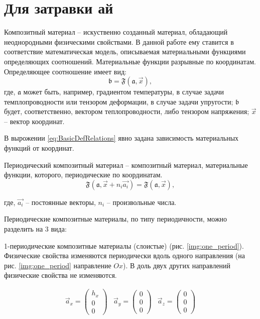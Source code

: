 \chapter{Для затравки ай} \label{chapt1}

Композитный материал -- искуственно созданный материал, обладающий неоднородными физическими свойствами.
В данной работе ему ставится в соответствие математическая модель, описываемая материальными функциями определяющих соотношений. Материальные функции
разрывные по координатам.
Определяющее соотношение имеет вид:
\begin{equation}
    \label{eq:BasicDefRelations}
\mathfrak{b} = \mathfrak{F}(\mathfrak{a}, \vec{x}),
\end{equation}
где, $\mathfrak{a}$ может быть, например, градиентом температуры, в случае задачи темплопроводности или тензором деформации, в случае
задачи упругости; $\mathfrak{b}$ будет, соответственно, вектором теплопроводности, либо тензором напряжения; $\vec{x}$ -- вектор координат.

В вырожении \ref{eq:BasicDefRelations} явно задана зависимость материальных функций от координат.

Периодический композитный материал -- композитный материал, материальные функции, которого, периодические по координатам.
\begin{equation}
    \label{eq:BasicPeriodicFuction}
    \mathfrak{F}(\mathfrak{a}, \vec{x} + n_i\vec{a_i}) = \mathfrak{F}(\mathfrak{a}, \vec{x}),
\end{equation}

где, $\vec{a_i}$ -- постоянные векторы, $n_i$ -- произвольные числа.

Периодические композитные материалы, по типу периодичности, можно разделить на 3 вида:

1-периодические композитные материалы (слоистые) (рис. \ref{img:one_period}).
Физические свойства изменяются периодически вдоль одного направления (на рис. \ref{img:one_period} направление $Ox$). В доль двух других направлений
физические свойства не изменяются.

\begin{equation}
    \begin{array}{ccc}
        \vec{a}_x = \left(\begin{array}{c}h_x\\0\\0\end{array}\right) & 
        \vec{a}_y = \left(\begin{array}{c}0\\0\\0\end{array}\right) & 
        \vec{a}_z = \left(\begin{array}{c}0\\0\\0\end{array}\right)
    \end{array}
\end{equation}

